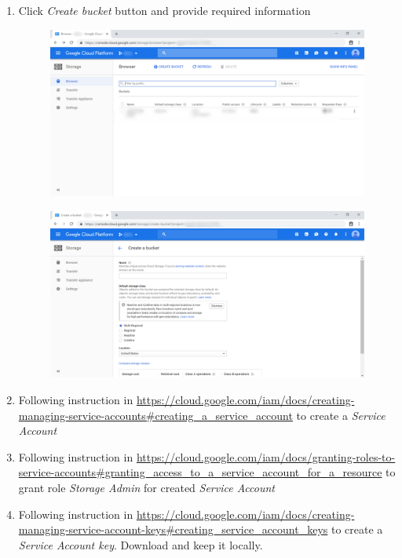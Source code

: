 \begin{enumerate}
\begin{center}
\begin{figure}[H]
	      	\end{figure}
	      \end{center}
	\item Click \textit{Create bucket} button and provide required information
	      \begin{center}
	      	\begin{figure}[H]
	      		\centering
	      		\includegraphics[width=0.6\columnwidth]{images/appendixA/GCP-Storage.PNG}
	      	\end{figure}
	      	\begin{figure}[H]
	      		\centering
	      		\includegraphics[width=0.6\columnwidth]{images/appendixA/GCP-Storage-create-bucket.PNG}
	      	\end{figure}
	      \end{center}
			\vspace{-1cm}
	\item Following instruction in \href{https://cloud.google.com/iam/docs/creating-managing-service-accounts#creating_a_service_account}{https://cloud.google.com/iam/docs/creating-managing-service-accounts\#creating\_a\_service\_account} to create a \textit{Service Account} 
	\item Following instruction in \href{https://cloud.google.com/iam/docs/granting-roles-to-service-accounts#granting_access_to_a_service_account_for_a_resource}{https://cloud.google.com/iam/docs/granting-roles-to-service-accounts\#granting\_access\_to\_a\_service\_account\_for\_a\_resource} to grant role \textit{Storage Admin} for created \textit{Service Account}
	\item Following instruction in \href{https://cloud.google.com/iam/docs/creating-managing-service-account-keys#creating_service_account_keys}{https://cloud.google.com/iam/docs/creating-managing-service-account-keys\#creating\_service\_account\_keys} to create a \textit{Service Account key}. Download and keep it locally.
\end{enumerate}

